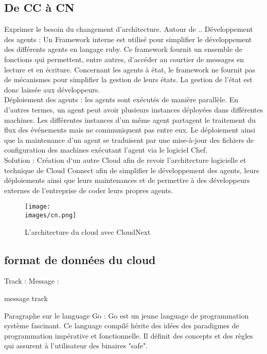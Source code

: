     \subsection{De \gls{CC} à \gls{CN}}
        Exprimer le besoin du changement d'architecture. 
        Autour de .. 
        Développement des agents : Un Framework interne est utilisé pour simplifier le développement des différents 
        agents en langage ruby. Ce framework fournit un ensemble de fonctions qui permettent, entre autres, d’accéder au 
        courtier de messages en lecture et en écriture. Concernant les agents à état, le framework ne fournit pas 
        de mécanismes pour simplifier la gestion de leurs états. La gestion de l’état est donc laissée aux développeurs.\\[0.3cm]
        Déploiement des agents : les agents sont exécutés de manière parallèle. En d’autres termes, un agent peut avoir 
        plusieurs instances déployées dans différentes machines. Les différentes instances d’un même agent partagent 
        le traitement du flux des événements mais ne communiquent pas entre eux. Le déploiement ainsi que la maintenance 
        d’un agent se traduisent par une mise-à-jour des fichiers de configuration des machines exécutant l’agent via le logiciel Chef.\\ [0.3cm]

        Solution :  Création d‘un autre Cloud afin de revoir l’architecture logicielle et technique de Cloud 
        Connect afin de simplifier le développement des agents, leurs déploiements ainsi que leurs maintenances et 
        de permettre à des développeurs externes de l’entreprise de coder leurs propres agents.



        \begin{figure}[ht]
            \centering
            \texttt{[image: \\images/cn.png]}
            \caption{L'architecture du cloud avec CloudNext}
        \end{figure}

        \vspace{0.2cm}

       

       

        \subsection{format de données du cloud }

        Track : 
        Message : 
        

        message track 

        Paragraphe sur le language Go : 
        Go\cite{rust_site} est un jeune language de programmation système
        fascinant. Ce language compilé hérite des idées des paradigmes de
        programmation impérative et fonctionnelle. Il définit des concepts et
        des règles qui assurent à l'utilisateur des binaires "safe".\\[0.3cm]
       
      
